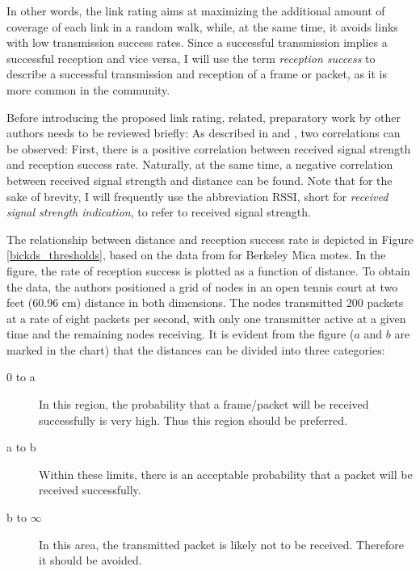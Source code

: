 In other words, the link rating aims at maximizing the additional amount of coverage of each link in a random walk, while, at the same time, it avoids links with low transmission success rates. Since a successful transmission implies a successful reception and vice versa, I will use the term \emph{reception success} to describe a successful transmission and reception of a frame or packet, as it is more common in the community.


Before introducing the proposed link rating, related, preparatory work by other authors needs to be reviewed briefly: As described in \cite{woo03} and \cite{zhao03performance}, two correlations can be observed: First, there is a positive correlation between received signal strength and reception success rate. Naturally, at the same time, a negative correlation between received signal strength and distance can be found. Note that for the sake of brevity, I will frequently use the abbreviation RSSI, short for \emph{received signal strength indication}, to refer to received signal strength.

The relationship between distance and reception success rate is depicted in Figure \ref{bickds_thresholds}, based on the data from \cite{woo03} for Berkeley Mica motes. In the figure, the rate of reception success is plotted as a function of distance. To obtain the data, the authors positioned a grid of nodes in an open tennis court at two feet (60.96 cm) distance in both dimensions. The nodes transmitted 200 packets at a rate of eight packets per second, with only one transmitter active at a given time and the remaining nodes receiving. It is evident from the figure ($a$ and $b$ are marked in the chart) that the distances can be divided into three categories:


\begin{description}
\item[0 to a] In this region, the probability that a frame/packet will be received successfully is very high. Thus this region should be preferred.

\item[a to b] Within these limits, there is an acceptable probability that a packet will be received successfully.

\item[b to $\infty$] In this area, the transmitted packet is likely not to be received. Therefore it should be avoided.

\end{description}

